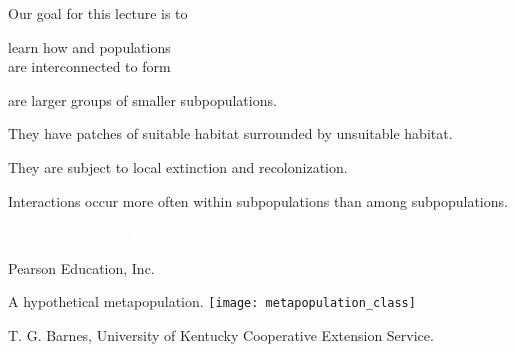 \documentclass[t]{beamer}
\begin{document}

\begin{frame}{Our goal for this lecture is to}

	\hangpara learn how  and  populations\\are interconnected to form 
	
\end{frame}
%
%
%
\begin{frame}{ are larger groups of smaller subpopulations.}

	\hangpara They have patches of suitable habitat surrounded by unsuitable habitat.
	
	\hangpara They are subject to local extinction and recolonization.
	
	\hangpara Interactions occur more often within subpopulations than among subpopulations.

\end{frame}
%
{
\begin{frame}[b]
	\hfill \tiny	\textcolor{white}{Marie-Lan Nguyen, Flickr, }
\end{frame}
}
%
{
\begin{frame}[b]
	\tiny \textcopyright Pearson Education, Inc.
\end{frame}
}
%
\begin{frame}{A hypothetical metapopulation.}
	\centering
	\texttt{[image: metapopulation\_class]}
	
	\vfilll
	
	\hfill \tiny \textcopyright T. G. Barnes, University of Kentucky Cooperative Extension Service.
\end{frame}
\end{document}
